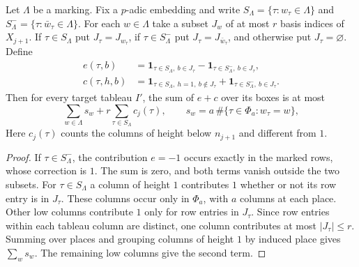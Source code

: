 \begin{lemma}
\label{lem:a-marked-neighbor-box-count}
\emitthmsource
Let $\Lambda$ be a marking. Fix a $p$-adic embedding and write $S_\Lambda=\{\tau:w_\tau\in\Lambda\}$ and $S_\Lambda^-=\{\tau:\bar w_\tau\in\Lambda\}$. For each $w\in\Lambda$ take a subset $J_w$ of at most $r$ basis indices of $X_{j+1}$. If $\tau\in S_\Lambda$ put $J_\tau=J_{w_\tau}$, if $\tau\in S_\Lambda^-$ put $J_\tau=J_{\bar w_\tau}$, and otherwise put $J_\tau=\varnothing$. Define
\[
 \begin{aligned}
 e(\tau,b)&=\mathbf 1_{\tau\in S_\Lambda,\ b\in J_\tau}
              -\mathbf 1_{\tau\in S_\Lambda^-,\ b\in J_\tau},\\
 c(\tau,h,b)&=\mathbf 1_{\tau\in S_\Lambda,\ h=1,\ b\notin J_\tau}
              +\mathbf 1_{\tau\in S_\Lambda^-,\ b\in J_\tau}.
 \end{aligned}
\]
Then for every target tableau $I'$, the sum of $e+c$ over its boxes is at most
\[
 \sum_{w\in\Lambda}s_w+r\sum_{\tau\in S_\Lambda}c_j(\tau),
 \qquad s_w=a\,\#\{\tau\in\Phi_a:w_\tau=w\},
\]
Here $c_j(\tau)$ counts the columns of height below $n_{j+1}$ and different from $1$.
\end{lemma}
\begin{proof}
If $\tau\in S_\Lambda^-$, the contribution $e=-1$ occurs exactly in the marked rows, whose correction is $1$. The sum is zero, and both terms vanish outside the two subsets. For $\tau\in S_\Lambda$ a column of height $1$ contributes $1$ whether or not its row entry is in $J_\tau$. These columns occur only in $\Phi_a$, with $a$ columns at each place. Other low columns contribute $1$ only for row entries in $J_\tau$. Since row entries within each tableau column are distinct, one column contributes at most $|J_\tau|\le r$. Summing over places and grouping columns of height $1$ by induced place gives $\sum_w s_w$. The remaining low columns give the second term.
\end{proof}

